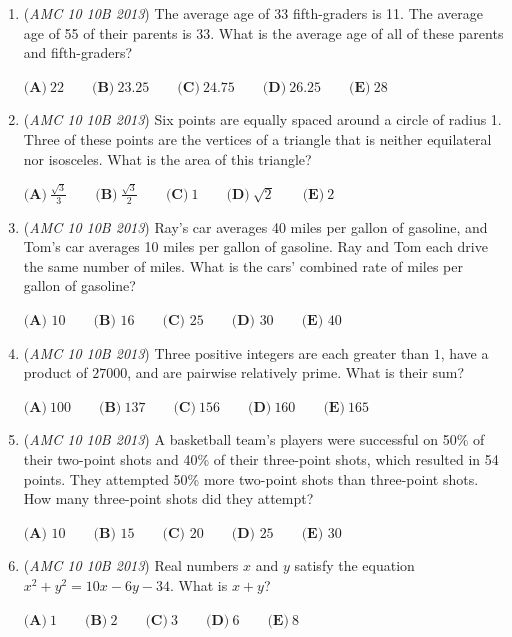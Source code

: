 \begin{enumerate}
	\item (\textit{AMC 10 10B 2013}) The average age of 33 fifth-graders is 11. The average age of 55 of their parents is 33. What is the average age of all of these parents and fifth-graders?


 $\textbf{(A)}\ 22\qquad\textbf{(B)}\ 23.25\qquad\textbf{(C)}\ 24.75\qquad\textbf{(D)}\ 26.25\qquad\textbf{(E)}\ 28$


	\item (\textit{AMC 10 10B 2013}) Six points are equally spaced around a circle of radius 1.  Three of these points are the vertices of a triangle that is neither equilateral nor isosceles.  What is the area of this triangle?


 $\textbf{(A)}\ \frac{\sqrt{3}}{3}\qquad\textbf{(B)}\ \frac{\sqrt{3}}{2}\qquad\textbf{(C)}\ 1\qquad\textbf{(D)}\ \sqrt{2}\qquad\textbf{(E)}\ \text{2}$


	\item (\textit{AMC 10 10B 2013}) Ray's car averages 40 miles per gallon of gasoline, and Tom's car averages 10 miles per gallon of gasoline. Ray and Tom each drive the same number of miles. What is the cars' combined rate of miles per gallon of gasoline?


 $\textbf{(A) }10\qquad\textbf{(B) }16\qquad\textbf{(C) }25\qquad\textbf{(D) }30\qquad\textbf{(E) }40$


	\item (\textit{AMC 10 10B 2013}) Three positive integers are each greater than $1$, have a product of $27000$, and are pairwise relatively prime. What is their sum?


 $\textbf{(A)}\ 100\qquad\textbf{(B)}\ 137\qquad\textbf{(C)}\ 156\qquad\textbf{(D)}\ 160\qquad\textbf{(E)}\ 165$


	\item (\textit{AMC 10 10B 2013}) A basketball team's players were successful on 50\% of their two-point shots and 40\% of their three-point shots, which resulted in 54 points. They attempted 50\% more two-point shots than three-point shots. How many three-point shots did they attempt?


 $\textbf{(A) }10\qquad\textbf{(B) }15\qquad\textbf{(C) }20\qquad\textbf{(D) }25\qquad\textbf{(E) }30$


	\item (\textit{AMC 10 10B 2013}) Real numbers $x$ and $y$ satisfy the equation $x^2 + y^2 = 10x - 6y - 34$.  What is $x+y$?


 $\textbf{(A)}\ 1 \qquad\textbf{(B)}\ 2  \qquad\textbf{(C)}\ 3 \qquad\textbf{(D)}\ 6 \qquad\textbf{(E)}\ 8$



\end{enumerate}

